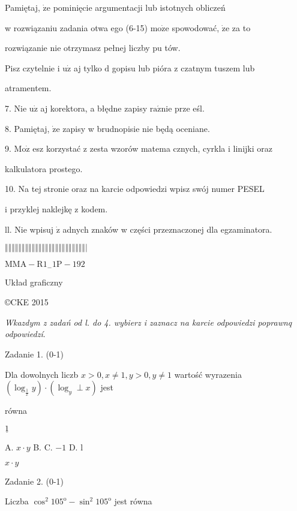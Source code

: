 \documentclass[a4paper,12pt]{article}
\begin{document}
Pamiętaj, $\dot{\mathrm{z}}\mathrm{e}$ pominięcie argumentacji lub istotnych obliczeń

w rozwiązaniu zadania otwa ego (6-15) $\mathrm{m}\mathrm{o}\dot{\mathrm{z}}\mathrm{e}$ spowodować, $\dot{\mathrm{z}}\mathrm{e}$ za to

rozwiązanie nie otrzymasz pełnej liczby pu tów.

Pisz czytelnie i $\mathrm{u}\dot{\mathrm{z}}$ aj tylko $\mathrm{d}$ gopisu lub pióra z czatnym tuszem lub

atramentem.

7. Nie $\mathrm{u}\dot{\mathrm{z}}$ aj korektora, a błędne zapisy $\mathrm{r}\mathrm{a}\acute{\mathrm{z}}\mathrm{n}\mathrm{i}\mathrm{e}$ prze eśl.

8. Pamiętaj, $\dot{\mathrm{z}}\mathrm{e}$ zapisy w brudnopisie nie będą oceniane.

9. $\mathrm{M}\mathrm{o}\dot{\mathrm{z}}$ esz korzystać z zesta wzorów matema cznych, cyrkla i linijki oraz

kalkulatora prostego.

10. Na tej stronie oraz na karcie odpowiedzi wpisz swój numer PESEL

i przyklej naklejkę z kodem.

ll. Nie wpisuj $\dot{\mathrm{z}}$ adnych znaków w części przeznaczonej dla egzaminatora.

$\Vert\Vert\Vert\Vert\Vert\Vert\Vert\Vert\Vert\Vert\Vert\Vert\Vert\Vert\Vert\Vert\Vert\Vert\Vert\Vert\Vert\Vert\Vert\Vert|$

$\mathrm{M}\mathrm{M}\mathrm{A}-\mathrm{R}1_{-}1\mathrm{P}-192$

Układ graficzny

\copyright CKE 2015




{\it Wkazdym z zadań od l. do 4. wybierz i zaznacz na karcie odpowiedzi poprawnq odpowiedzí}.

Zadanie 1. (0-1)

Dla dowolnych liczb $x>0, x\neq 1, y>0, y\neq 1$ wartość wyrazenia $(\log_{\frac{1}{x}}y)\cdot(\log_{y}\perp x)$ jest

równa

$\underline{1}$

A. $x\cdot y$ B. C. $-1$ D. l

$x\cdot y$

Zadanie 2. (0-1)

Liczba $\cos^{2}105^{\mathrm{o}}-\sin^{2}105^{\mathrm{o}}$ jest równa
\end{document}
